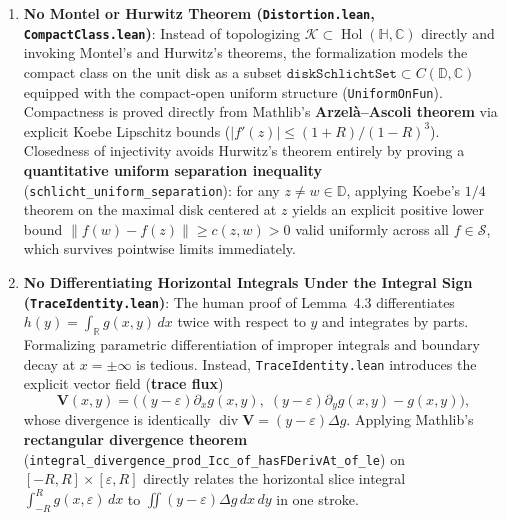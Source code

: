 \documentclass[11pt,reqno]{amsart}
\theoremstyle{definition}
\newcommand{\D}{\mathbb{D}}
\newcommand{\C}{\mathbb{C}}
\newcommand{\R}{\mathbb{R}}
\newcommand{\uhp}{\mathbb{H}}
\newcommand{\Kclass}{\mathcal{K}}
\newcommand{\Sclass}{\mathcal{S}}
\begin{document}
\begin{enumerate}[label=\textbf{Bypass \arabic*.},leftmargin=*]
\item \textbf{No Montel or Hurwitz Theorem (\texttt{Distortion.lean}, \texttt{CompactClass.lean})}:
Instead of topologizing $\Kclass \subset \operatorname{Hol}(\uhp,\C)$ directly and invoking Montel's and Hurwitz's theorems, the formalization models the compact class on the unit disk as a subset $\texttt{diskSchlichtSet} \subset C(\D, \C)$ equipped with the compact-open uniform structure (\texttt{UniformOnFun}). Compactness is proved directly from Mathlib's \textbf{Arzel\`a--Ascoli theorem} via explicit Koebe Lipschitz bounds ($|f'(z)| \le (1+R)/(1-R)^3$). Closedness of injectivity avoids Hurwitz's theorem entirely by proving a \textbf{quantitative uniform separation inequality} (\texttt{schlicht\_uniform\_separation}): for any $z \ne w \in \D$, applying Koebe's $1/4$ theorem on the maximal disk centered at $z$ yields an explicit positive lower bound $\|f(w)-f(z)\| \ge c(z,w) > 0$ valid uniformly across all $f \in \Sclass$, which survives pointwise limits immediately.

\item \textbf{No Differentiating Horizontal Integrals Under the Integral Sign (\texttt{TraceIdentity.lean})}:
The human proof of Lemma~4.3 differentiates $h(y) = \int_\R g(x,y)\,dx$ twice with respect to $y$ and integrates by parts. Formalizing parametric differentiation of improper integrals and boundary decay at $x = \pm\infty$ is tedious. Instead, \texttt{TraceIdentity.lean} introduces the explicit vector field (\textbf{trace flux})
\[
\mathbf{V}(x,y) = \bigl((y-\varepsilon)\partial_x g(x,y),\; (y-\varepsilon)\partial_y g(x,y) - g(x,y)\bigr),
\]
whose divergence is identically $\operatorname{div}\mathbf{V} = (y-\varepsilon)\Delta g$. Applying Mathlib's \textbf{rectangular divergence theorem} (\texttt{integral\_divergence\_prod\_Icc\_of\_hasFDerivAt\_of\_le}) on $[-R,R] \times [\varepsilon, R]$ directly relates the horizontal slice integral $\int_{-R}^R g(x,\varepsilon)\,dx$ to $\iint (y-\varepsilon)\Delta g\,dx\,dy$ in one stroke.


\end{enumerate}
\end{document}
